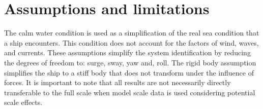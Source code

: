 %
%
%
\section{Assumptions and limitations}

The calm water condition is used as a simplification of the real sea condition that a ship encounters. This condition does not account for the factors of wind, waves, and currents. These assumptions simplify the system identification by reducing the degrees of freedom to: surge, sway, yaw and, roll. 
The rigid body assumption simplifies the ship to a stiff body that does not transform under the influence of forces. 
It is important to note that all results are not necessarily directly transferable to the full scale when model scale data is used considering potential scale effects. 

